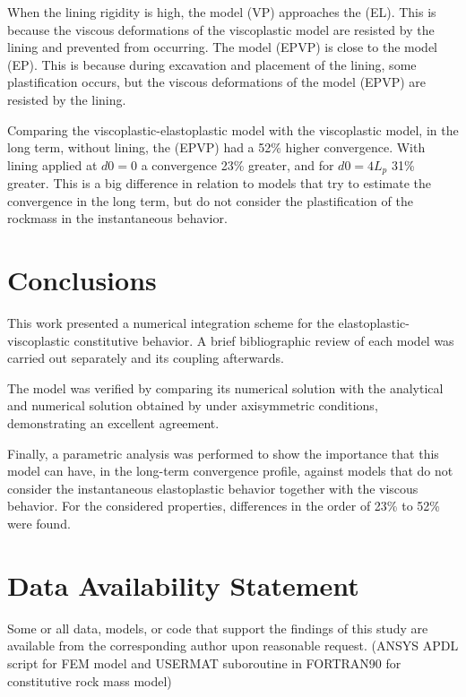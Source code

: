 \documentclass[Journal,letterpaper]{ascelike-new}
\begin{document}
When the lining rigidity is high, the model (VP) approaches the (EL). This is because the viscous deformations of the viscoplastic model are resisted by the lining and prevented from occurring. The model (EPVP) is close to the model (EP). This is because during excavation and placement of the lining, some plastification occurs, but the viscous deformations of the model (EPVP) are resisted by the lining.

Comparing the viscoplastic-elastoplastic model with the viscoplastic model, in the long term, without lining, the (EPVP) had a 52\% higher convergence. With lining applied at $d0=0$ a convergence 23\% greater, and for $d0=4L_p$ 31\% greater. This is a big difference in relation to models that try to estimate the convergence in the long term, but do not consider the plastification of the rockmass in the instantaneous behavior.

\section{Conclusions}

This work presented a numerical integration scheme for the elastoplastic-viscoplastic constitutive behavior. A brief bibliographic review of each model was carried out separately and its coupling afterwards.

The model was verified by comparing its numerical solution with the analytical and numerical solution obtained by  under axisymmetric conditions, demonstrating an excellent agreement.

Finally, a parametric analysis was performed to show the importance that this model can have, in the long-term convergence profile, against models that do not consider the instantaneous elastoplastic behavior together with the viscous behavior. For the considered properties, differences in the order of 23\% to 52\% were found.

\section{Data Availability Statement}

Some or all data, models, or code that support the findings of this study are available from the corresponding author upon reasonable request. (ANSYS APDL script for FEM model and USERMAT suboroutine in FORTRAN90 for constitutive rock mass model)

\pagebreak
%
%
%
%
%
%
%

%
\end{document}
